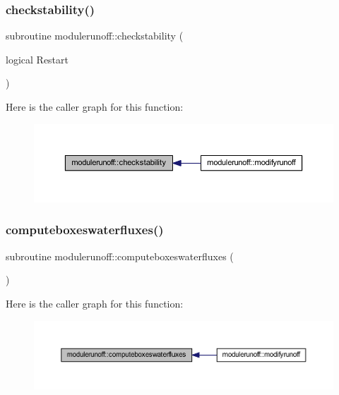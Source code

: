 \subsubsection{\texorpdfstring{checkstability()}{checkstability()}}
{\footnotesize\ttfamily subroutine modulerunoff\+::checkstability (\begin{DoxyParamCaption}\item[{logical}]{Restart }\end{DoxyParamCaption})\hspace{0.3cm}{\ttfamily [private]}}

Here is the caller graph for this function\+:\nopagebreak
\begin{figure}[H]
\begin{center}
\leavevmode
\includegraphics[width=350pt]{namespacemodulerunoff_a330dcdf852e8d32ad8f61027fca5572d_icgraph}
\end{center}
\end{figure}
\mbox{\label{namespacemodulerunoff_a88ccc0aaa3ecf729db168b684f5b4801}} 
\subsubsection{\texorpdfstring{computeboxeswaterfluxes()}{computeboxeswaterfluxes()}}
{\footnotesize\ttfamily subroutine modulerunoff\+::computeboxeswaterfluxes (\begin{DoxyParamCaption}{ }\end{DoxyParamCaption})\hspace{0.3cm}{\ttfamily [private]}}

Here is the caller graph for this function\+:\nopagebreak
\begin{figure}[H]
\begin{center}
\leavevmode
\includegraphics[width=350pt]{namespacemodulerunoff_a88ccc0aaa3ecf729db168b684f5b4801_icgraph}
\end{center}
\end{figure}
\mbox{\label{namespacemodulerunoff_a922ce27a6758e75221357b9572099e5a}} 
